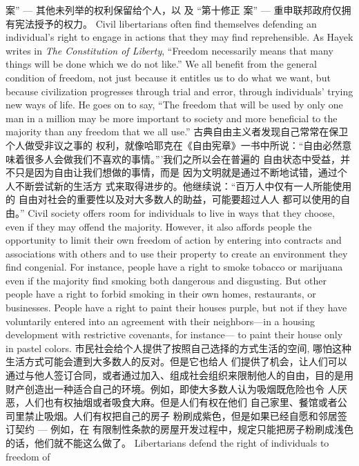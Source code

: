 \begin{paracol}{2}
案”  --- 其他未列举的权利保留给个人，以 及 “第十修正
案”  --- 重申联邦政府仅拥有宪法授予的权力。
\switchcolumn*
Civil libertarians often find themselves defending an individual's right to engage in actions that they may find reprehensible. As Hayek writes in \textit{The Constitution of Liberty}, ``Freedom
necessarily means that many things will be done which we do
not like.'' We all benefit from the general condition of freedom,
not just because it entitles us to do what we want, but because
civilization progresses through trial and error, through individuals' trying new ways of life. He goes on to say, ``The freedom
that will be used by only one man in a million may be more important to society and more beneficial to the majority than any
freedom that we all use.''
\switchcolumn
古典自由主义者发现自己常常在保卫个人做受非议之事的
权利，就像哈耶克在《自由宪章》一书中所说：“自由必然意
味着很多人会做我们不喜欢的事情。”’我们之所以会在普遍的
自由状态中受益，并不只是因为自由让我们想做的事情，而是
因为文明就是通过不断地试错，通过个人不断尝试新的生活方
式来取得进步的。他继续说：“百万人中仅有一人所能使用的
自由对社会的重要性以及对大多数人的助益，可能要超过人人
都可以使用的自由。”
\switchcolumn*
Civil society offers room for individuals to live in ways that
they choose, even if they may offend the majority. However, it
also affords people the opportunity to limit their own freedom
of action by entering into contracts and associations with others
and to use their property to create an environment they find congenial. For instance, people have a right to smoke tobacco or
marijuana even if the majority find smoking both dangerous
and disgusting. But other people have a right to forbid smoking
in their own homes, restaurants, or businesses. People have a
right to paint their houses purple, but not if they have voluntarily entered into an agreement with their neighbors---in a
housing development with restrictive covenants, for instance---
to paint their house only in pastel colors.
\switchcolumn
市民社会给个人提供了按照自己选择的方式生活的空间,
哪怕这种生活方式可能会遭到大多数人的反对。但是它也给人
们提供了机会，让人们可以通过与他人签订合同，或者通过加入、组成社会组织来限制他人的自由，目的是用财产创造出一种适合自己的环境。例如，即使大多数人认为吸烟既危险也令
人厌恶，人们也有权抽烟或者吸食大麻。但是人们有权在他们
自己家里、餐馆或者公司里禁止吸烟。人们有权把自己的房子
粉刷成紫色，但是如果已经自愿和邻居签订契约 --- 例如，在
有限制性条款的房屋开发过程中，规定只能把房子粉刷成浅色
的话，他们就不能这么做了。
\switchcolumn*
Libertarians defend the right of individuals to freedom of

\end{paracol}
